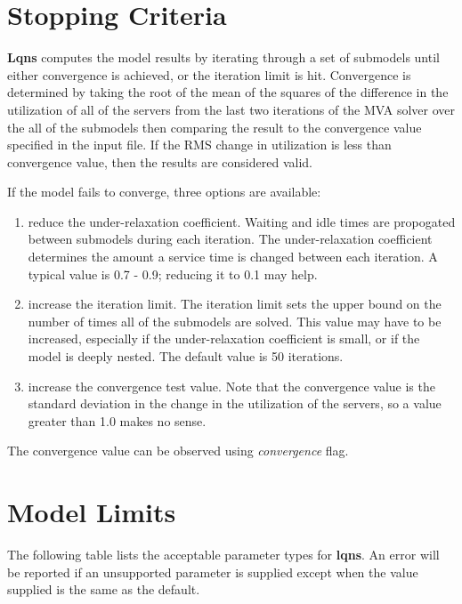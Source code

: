 \section{Stopping Criteria}
\label{sec:lqns-stopping-criteria}
\textbf{Lqns} computes the model results by iterating through a set of
submodels until either convergence is achieved, or the iteration limit
is hit. Convergence is determined by taking the root of the mean of
the squares of the difference in the utilization of all of the servers
from the last two iterations of the MVA solver over the all of the
submodels then comparing the result to the convergence value specified
in the input file. If the RMS change in utilization is less than
convergence value, then the results are considered valid.


If the model fails to converge, three options are available:
\begin{enumerate}
\item reduce the under-relaxation coefficient. Waiting and idle times are
propogated between submodels during each iteration. The
under-relaxation coefficient determines the amount a service time is
changed between each iteration. A typical value is 0.7 - 0.9; reducing
it to 0.1 may help.
\item increase the iteration limit. The iteration limit sets the upper bound
on the number of times all of the submodels are solved. This value may
have to be increased, especially if the under-relaxation coefficient
is small, or if the model is deeply nested. The default value is 50
iterations.
\item increase the convergence test value. Note that the convergence value
is the standard deviation in the change in the utilization of the
servers, so a value greater than 1.0 makes no sense.
\end{enumerate}


The convergence value can be observed using \emph{convergence} flag.
\section{Model Limits}
\label{sec:model-limits}
The following table lists the acceptable parameter types for
\textbf{lqns}.  An error will
be reported if an unsupported parameter is supplied except when the
value supplied is the same as the default.


